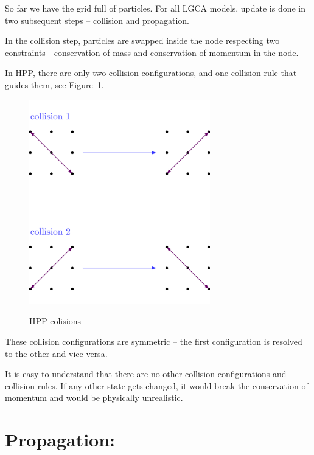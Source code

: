 So far we have the grid full of particles.
For all LGCA models, update is done in two subsequent steps -- collision and propagation.

In the collision step, particles are swapped inside the node respecting two constraints - conservation of mass and conservation of momentum in the node.

In HPP, there are only two collision configurations, and one collision rule that guides them, see Figure~\ref{hpp-colision}.

\begin{figure}[H]
 \centering
 \includegraphics[width=0.7\textwidth]{./img/hpp_col}
 \label{hpp-colision}
 \caption{HPP colisions}
\end{figure}

These collision configurations are symmetric -- the first configuration is resolved to the other and vice versa.

It is easy to understand that there are no other collision configurations and collision rules. If any other state gets changed, it would break the conservation of momentum and would be physically unrealistic.

\section{Propagation:}

